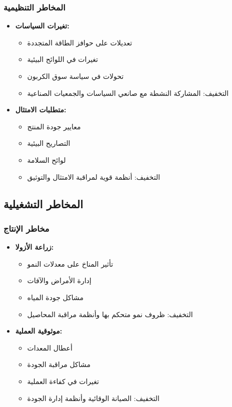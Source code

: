 \subsubsection{المخاطر التنظيمية}
\begin{itemize}
    \item \textbf{تغيرات السياسات:}
    \begin{itemize}
        \item تعديلات على حوافز الطاقة المتجددة
        \item تغيرات في اللوائح البيئية
        \item تحولات في سياسة سوق الكربون
        \item التخفيف: المشاركة النشطة مع صانعي السياسات والجمعيات الصناعية
    \end{itemize}
    
    \item \textbf{متطلبات الامتثال:}
    \begin{itemize}
        \item معايير جودة المنتج
        \item التصاريح البيئية
        \item لوائح السلامة
        \item التخفيف: أنظمة قوية لمراقبة الامتثال والتوثيق
    \end{itemize}
\end{itemize}

\subsection{المخاطر التشغيلية}

\subsubsection{مخاطر الإنتاج}
\begin{itemize}
    \item \textbf{زراعة الأزولا:}
    \begin{itemize}
        \item تأثير المناخ على معدلات النمو
        \item إدارة الأمراض والآفات
        \item مشاكل جودة المياه
        \item التخفيف: ظروف نمو متحكم بها وأنظمة مراقبة المحاصيل
    \end{itemize}
    
    \item \textbf{موثوقية العملية:}
    \begin{itemize}
        \item أعطال المعدات
        \item مشاكل مراقبة الجودة
        \item تغيرات في كفاءة العملية
        \item التخفيف: الصيانة الوقائية وأنظمة إدارة الجودة
    \end{itemize}
\end{itemize}

